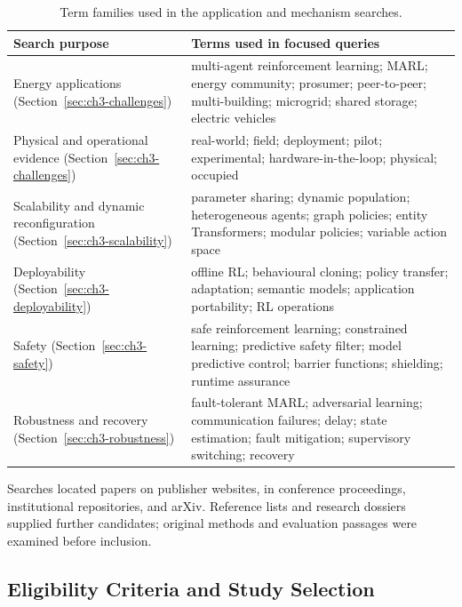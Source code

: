 \begin{table}[!htbp]
\centering
\caption{Term families used in the application and mechanism searches.}
\label{tab:ch3-search-terms}
\small
\setlength{\tabcolsep}{5pt}
\renewcommand{\arraystretch}{1.12}
\begin{tabularx}{\textwidth}{@{}>{\raggedright\arraybackslash}p{}>{\raggedright\arraybackslash}X@{}}
\toprule
Search purpose & Terms used in focused queries\\
\midrule
Energy applications (Section~\ref{sec:ch3-challenges}) &
multi-agent reinforcement learning; MARL; energy community; prosumer; peer-to-peer; multi-building; microgrid; shared storage; electric vehicles\\
\addlinespace
Physical and operational evidence (Section~\ref{sec:ch3-challenges}) &
real-world; field; deployment; pilot; experimental; hardware-in-the-loop; physical; occupied\\
\addlinespace
Scalability and dynamic reconfiguration (Section~\ref{sec:ch3-scalability}) &
parameter sharing; dynamic population; heterogeneous agents; graph policies; entity Transformers; modular policies; variable action space\\
\addlinespace
Deployability (Section~\ref{sec:ch3-deployability}) &
offline RL; behavioural cloning; policy transfer; adaptation; semantic models; application portability; RL operations\\
\addlinespace
Safety (Section~\ref{sec:ch3-safety}) &
safe reinforcement learning; constrained learning; predictive safety filter; model predictive control; barrier functions; shielding; runtime assurance\\
\addlinespace
Robustness and recovery (Section~\ref{sec:ch3-robustness}) &
fault-tolerant MARL; adversarial learning; communication failures; delay; state estimation; fault mitigation; supervisory switching; recovery\\
\bottomrule
\end{tabularx}
\end{table}

Searches located papers on publisher websites, in conference proceedings, institutional repositories, and arXiv. Reference lists and research dossiers supplied further candidates; original methods and evaluation passages were examined before inclusion.

\subsection{Eligibility Criteria and Study Selection}
\label{sec:ch3-selection}
\label{sec:ch3-extraction}
\label{sec:ch2-synthesis-method}

